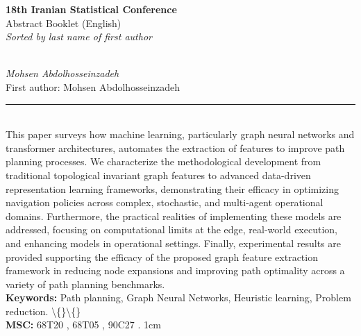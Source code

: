 \documentclass[10pt,twoside]{article}
\begin{document}
\begin{center}
{\Large\bfseries 18th Iranian Statistical Conference}\\[0.3em]
{\large Abstract Booklet (English)}\\[0.3em]
{\small\itshape Sorted by last name of first author}
\end{center}
\newpage

\noindent\begin{minipage}[t][\textheight]{\textwidth}
\\[0.35em]
{\itshape Mohsen Abdolhosseinzadeh}\\[0.2em]
{\footnotesize First author: Mohsen Abdolhosseinzadeh}\\[0.45em]
\noindent\rule{\textwidth}{0.3pt}\\[0.4em]
{\footnotesize  This paper surveys how machine learning, particularly graph neural networks and transformer architectures, automates the extraction of features to improve path planning processes. We characterize the methodological development from traditional topological invariant graph features to advanced data-driven representation learning frameworks, demonstrating their efficacy in optimizing navigation policies across complex, stochastic, and multi-agent operational domains. Furthermore, the practical realities of implementing these models are addressed, focusing on computational limits at the edge, real-world execution, and enhancing models in operational settings. Finally, experimental results are provided supporting the efficacy of the proposed graph feature extraction framework in reducing node expansions and improving path optimality across a variety of path planning benchmarks.}\\[0.4em]
{\footnotesize\bfseries Keywords:} {\footnotesize Path planning, Graph Neural Networks, Heuristic learning, Problem reduction. \textbackslash\{\}\textbackslash\{\}}\\[0.15em]
{\footnotesize\bfseries MSC:} {\footnotesize 68T20 , 68T05 , 90C27 . 1cm}\\
\vfill
\end{minipage}
\newpage
\end{document}
